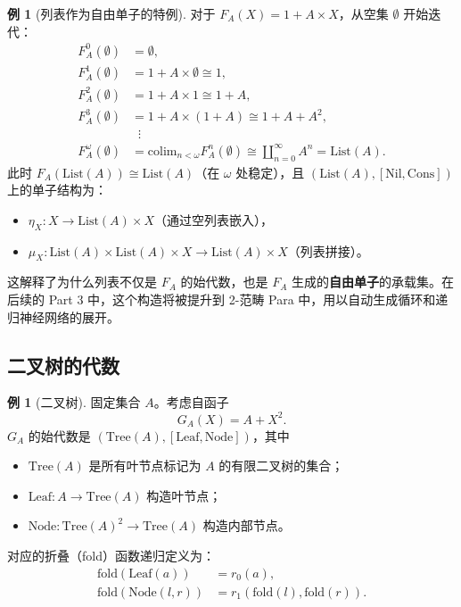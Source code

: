\documentclass[12pt,a4paper]{ctexart}
\theoremstyle{definition}
\newtheorem{example}[definition]{例}
\newcommand{\List}{\mathrm{List}}
\newcommand{\Tree}{\mathrm{Tree}}
\newcommand{\colim}{\mathrm{colim}}
\newcommand{\fold}{\mathrm{fold}}
\begin{document}
\begin{example}[列表作为自由单子的特例]
对于 $F_A(X)=1+A\times X$，从空集 $\emptyset$ 开始迭代：
\begin{align*}
F_A^0(\emptyset) &= \emptyset,\\
F_A^1(\emptyset) &= 1+A\times\emptyset \cong 1,\\
F_A^2(\emptyset) &= 1+A\times 1 \cong 1+A,\\
F_A^3(\emptyset) &= 1+A\times(1+A) \cong 1+A+A^2,\\
&\;\;\vdots\\
F_A^\omega(\emptyset) &= \colim_{n<\omega} F_A^n(\emptyset) \cong \coprod_{n=0}^\infty A^n = \List(A).
\end{align*}
此时 $F_A(\List(A))\cong\List(A)$（在 $\omega$ 处稳定），且 $(\List(A),[\mathrm{Nil},\mathrm{Cons}])$ 上的单子结构为：
\begin{itemize}[nosep]
    \item $\eta_X:X\to\List(A)\times X$（通过空列表嵌入），
    \item $\mu_X:\List(A)\times\List(A)\times X\to\List(A)\times X$（列表拼接）。
\end{itemize}
\end{example}

这解释了为什么列表不仅是 $F_A$ 的始代数，也是 $F_A$ 生成的\textbf{自由单子}的承载集。在后续的 Part 3 中，这个构造将被提升到 2-范畴 Para 中，用以自动生成循环和递归神经网络的展开。

\subsection{二叉树的代数}

\begin{example}[二叉树]\label{ex:tree}
固定集合 $A$。考虑自函子
\[G_A(X)=A+X^2.\]
$G_A$ 的始代数是 $(\Tree(A),[\mathrm{Leaf},\mathrm{Node}])$，其中
\begin{itemize}[nosep]
    \item $\Tree(A)$ 是所有叶节点标记为 $A$ 的有限二叉树的集合；
    \item $\mathrm{Leaf}:A\to\Tree(A)$ 构造叶节点；
    \item $\mathrm{Node}:\Tree(A)^2\to\Tree(A)$ 构造内部节点。
\end{itemize}
对应的折叠（fold）函数递归定义为：
\begin{align*}
\fold(\mathrm{Leaf}(a)) &= r_0(a),\\
\fold(\mathrm{Node}(l,r)) &= r_1(\fold(l),\fold(r)).
\end{align*}
\end{example}
\end{document}
